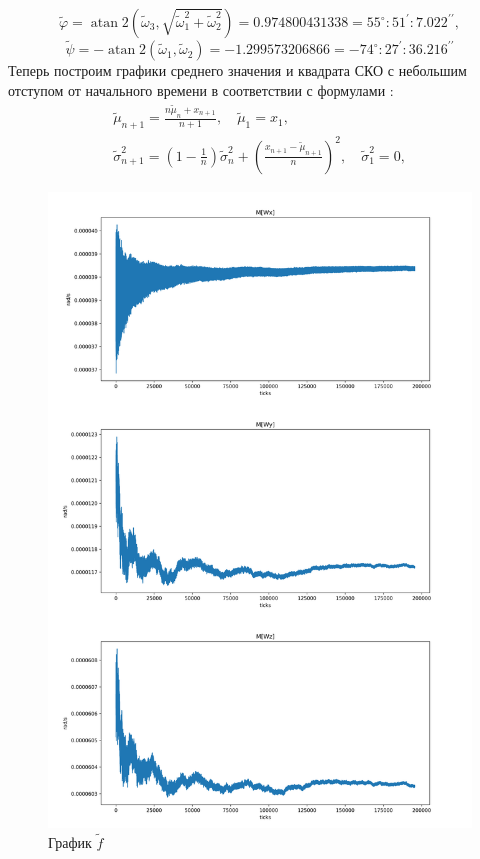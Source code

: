 \documentclass[a4paper,14pt]{article}
\theoremstyle{plain} %
\theoremstyle{definition} %
\theoremstyle{remark} %
\begin{document}
{$$
    \tilde{\varphi}=\operatorname{atan} 2\left(\widetilde{\omega}_{3}, \sqrt{\widetilde{\omega}_{1}^{2}+\widetilde{\omega}_{2}^{2}}\right)=0.974800431338=55^{\circ}: 51^{\prime}: 7.022^{\prime \prime},
$$
$$
    \widetilde{\psi}=-\operatorname{atan} 2\left(\widetilde{\omega}_{1}, \widetilde{\omega}_{2}\right)=-1.299573206866=-74^{\circ}: 27^{\prime}: 36.216^{\prime \prime}$$
Теперь построим графики среднего значения и квадрата СКО с небольшим отступом от начального времени в соответствии с формулами :
$$
    \begin{gathered}
        \widetilde{\mu}_{n+1}=\frac{n \widetilde{\mu}_{n}+x_{n+1}}{n+1}, \quad \widetilde{\mu}_{1}=x_{1}, \\
        \widetilde{\sigma}_{n+1}^{2}=\left(1-\frac{1}{n}\right) \widetilde{\sigma}_{n}^{2}+\left(\frac{x_{n+1}-\widetilde{\mu}_{n+1}}{n}\right)^{2}, \quad \widetilde{\sigma}_{1}^{2}=0,
    \end{gathered}
$$

\begin{figure}[h!]
    \centering
    \includegraphics[width=0.99\linewidth]{FullW.png}
    \caption{ График $\widetilde{f}$}
    \label{fig:ma}
\end{figure}

}
\end{document}
